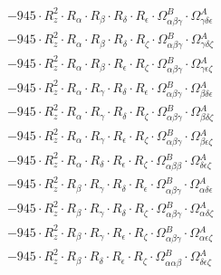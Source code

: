\documentclass{article}
\begin{document}
\begin{subequations}
\begin{gather}
\begin{array}{c}
 \\[0.2em] 		 - 945 \cdot R_{z}^{2} \cdot R_{\alpha{}} \cdot R_{\beta{}} \cdot R_{\delta{}} \cdot R_{\epsilon{}} \cdot \Omega{}^{B}_{\alpha{}\beta{}\gamma{}} \cdot \Omega{}^{A}_{\gamma{}\delta{}\epsilon{}} 
 \\[0.2em] 		 - 945 \cdot R_{z}^{2} \cdot R_{\alpha{}} \cdot R_{\beta{}} \cdot R_{\delta{}} \cdot R_{\zeta{}} \cdot \Omega{}^{B}_{\alpha{}\beta{}\gamma{}} \cdot \Omega{}^{A}_{\gamma{}\delta{}\zeta{}} 
 \\[0.2em] 		 - 945 \cdot R_{z}^{2} \cdot R_{\alpha{}} \cdot R_{\beta{}} \cdot R_{\epsilon{}} \cdot R_{\zeta{}} \cdot \Omega{}^{B}_{\alpha{}\beta{}\gamma{}} \cdot \Omega{}^{A}_{\gamma{}\epsilon{}\zeta{}} 
 \\[0.2em] 		 - 945 \cdot R_{z}^{2} \cdot R_{\alpha{}} \cdot R_{\gamma{}} \cdot R_{\delta{}} \cdot R_{\epsilon{}} \cdot \Omega{}^{B}_{\alpha{}\beta{}\gamma{}} \cdot \Omega{}^{A}_{\beta{}\delta{}\epsilon{}} 
 \\[0.2em] 		 - 945 \cdot R_{z}^{2} \cdot R_{\alpha{}} \cdot R_{\gamma{}} \cdot R_{\delta{}} \cdot R_{\zeta{}} \cdot \Omega{}^{B}_{\alpha{}\beta{}\gamma{}} \cdot \Omega{}^{A}_{\beta{}\delta{}\zeta{}} 
 \\[0.2em] 		 - 945 \cdot R_{z}^{2} \cdot R_{\alpha{}} \cdot R_{\gamma{}} \cdot R_{\epsilon{}} \cdot R_{\zeta{}} \cdot \Omega{}^{B}_{\alpha{}\beta{}\gamma{}} \cdot \Omega{}^{A}_{\beta{}\epsilon{}\zeta{}} 
 \\[0.2em] 		 - 945 \cdot R_{z}^{2} \cdot R_{\alpha{}} \cdot R_{\delta{}} \cdot R_{\epsilon{}} \cdot R_{\zeta{}} \cdot \Omega{}^{B}_{\alpha{}\beta{}\beta{}} \cdot \Omega{}^{A}_{\delta{}\epsilon{}\zeta{}} 
 \\[0.2em] 		 - 945 \cdot R_{z}^{2} \cdot R_{\beta{}} \cdot R_{\gamma{}} \cdot R_{\delta{}} \cdot R_{\epsilon{}} \cdot \Omega{}^{B}_{\alpha{}\beta{}\gamma{}} \cdot \Omega{}^{A}_{\alpha{}\delta{}\epsilon{}} 
 \\[0.2em] 		 - 945 \cdot R_{z}^{2} \cdot R_{\beta{}} \cdot R_{\gamma{}} \cdot R_{\delta{}} \cdot R_{\zeta{}} \cdot \Omega{}^{B}_{\alpha{}\beta{}\gamma{}} \cdot \Omega{}^{A}_{\alpha{}\delta{}\zeta{}} 
 \\[0.2em] 		 - 945 \cdot R_{z}^{2} \cdot R_{\beta{}} \cdot R_{\gamma{}} \cdot R_{\epsilon{}} \cdot R_{\zeta{}} \cdot \Omega{}^{B}_{\alpha{}\beta{}\gamma{}} \cdot \Omega{}^{A}_{\alpha{}\epsilon{}\zeta{}} 
 \\[0.2em] 		 - 945 \cdot R_{z}^{2} \cdot R_{\beta{}} \cdot R_{\delta{}} \cdot R_{\epsilon{}} \cdot R_{\zeta{}} \cdot \Omega{}^{B}_{\alpha{}\alpha{}\beta{}} \cdot \Omega{}^{A}_{\delta{}\epsilon{}\zeta{}} 

\end{array}
\end{gather}
\end{subequations}
\end{document}
